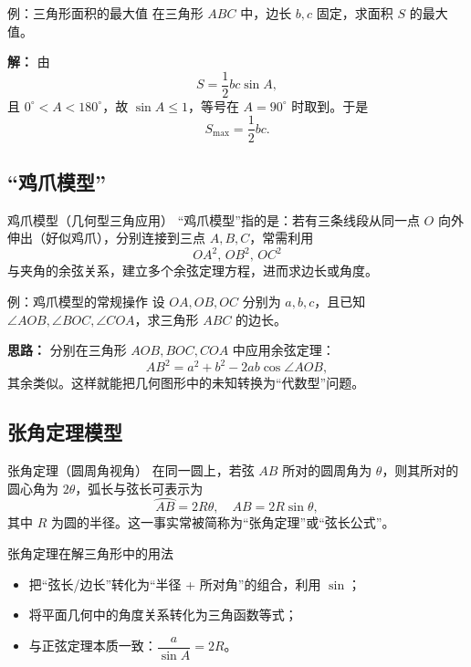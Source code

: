 \documentclass[a4paper,11pt]{ctexart}
\begin{document}
\begin{examplebox}{例：三角形面积的最大值}
在三角形 $ABC$ 中，边长 $b,c$ 固定，求面积 $S$ 的最大值。
\par\textbf{解：} 由
\[
S = \frac{1}{2}bc\sin A,
\]
且 $0^\circ<A<180^\circ$，故 $\sin A\le1$，等号在 $A=90^\circ$ 时取到。于是
\[
S_{\max} = \frac{1}{2}bc.
\]
\end{examplebox}

\subsection{“鸡爪模型”}

\begin{definitionbox}{鸡爪模型（几何型三角应用）}
“鸡爪模型”指的是：若有三条线段从同一点 $O$ 向外伸出（好似鸡爪），分别连接到三点 $A,B,C$，常需利用
\[
OA^2,\,OB^2,\,OC^2
\]
与夹角的余弦关系，建立多个余弦定理方程，进而求边长或角度。
\end{definitionbox}

\begin{examplebox}{例：鸡爪模型的常规操作}
设 $OA,OB,OC$ 分别为 $a,b,c$，且已知 $\angle AOB,\angle BOC,\angle COA$，求三角形 $ABC$ 的边长。
\par\textbf{思路：} 分别在三角形 $AOB,BOC,COA$ 中应用余弦定理：
\[
AB^2 = a^2+b^2-2ab\cos\angle AOB,
\]
其余类似。这样就能把几何图形中的未知转换为“代数型”问题。
\end{examplebox}

\subsection{张角定理模型}

\begin{definitionbox}{张角定理（圆周角视角）}
在同一圆上，若弦 $AB$ 所对的圆周角为 $\theta$，则其所对的圆心角为 $2\theta$，弧长与弦长可表示为
\[
\wideparen{AB} = 2R\theta,\quad AB = 2R\sin\theta,
\]
其中 $R$ 为圆的半径。这一事实常被简称为“张角定理”或“弦长公式”。
\end{definitionbox}

\begin{summarybox}{张角定理在解三角形中的用法}
\begin{itemize}
  \item 把“弦长/边长”转化为“半径 + 所对角”的组合，利用 $\sin$；
  \item 将平面几何中的角度关系转化为三角函数等式；
  \item 与正弦定理本质一致：$\dfrac{a}{\sin A}=2R$。
\end{itemize}
\end{summarybox}
\end{document}
